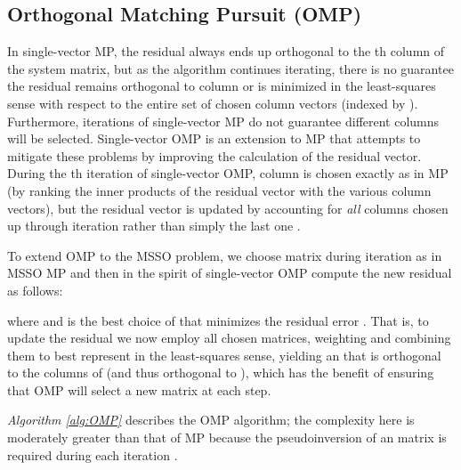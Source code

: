 \documentclass[final]{siamltex}
\newcommand{\la}[1]{\mbox{}}  \newcommand{\sst}[1]{\mbox{\scriptsize{#1}}}
\begin{document}
\subsection{Orthogonal Matching Pursuit (OMP)}

    In single-vector MP, the residual  always ends up
    orthogonal to the th column of the system matrix, but as the
    algorithm continues iterating, there is no guarantee the residual
    remains orthogonal to column  or is minimized in the
    least-squares sense with respect to the entire set of  chosen
    column vectors (indexed by ).  Furthermore, 
    iterations of single-vector MP do not guarantee  different
    columns will be selected.  Single-vector OMP is an extension to MP
    that attempts to mitigate these problems by improving the
    calculation of the residual vector.  During the th iteration of
    single-vector OMP, column  is chosen exactly as in MP (by
    ranking the inner products of the residual vector 
    with the various column vectors), but the residual vector is
    updated by accounting for {\em{all}} columns chosen up through
    iteration  rather than simply the last one \cite{Nat1995,
    Cot1999}.

    To extend OMP to the MSSO problem, we choose matrix  during
    iteration  as in MSSO MP and then in the spirit of
    single-vector OMP compute the new residual as follows:
     
    where  and  is the best choice of
    \la{x} that minimizes the residual error .  That is, to update the residual we now employ
    all chosen matrices, weighting and combining them to best
    represent \la{d} in the least-squares sense, yielding an
     that is orthogonal to the columns of  (and
    thus orthogonal to ), which
    has the benefit of ensuring that OMP will select a new 
    matrix at each step.

    {\em{Algorithm \ref{alg:OMP}}} describes the OMP algorithm; the
    complexity here is moderately greater than that of MP because the
    pseudoinversion of an  matrix is required during each
    iteration .
\end{document}
